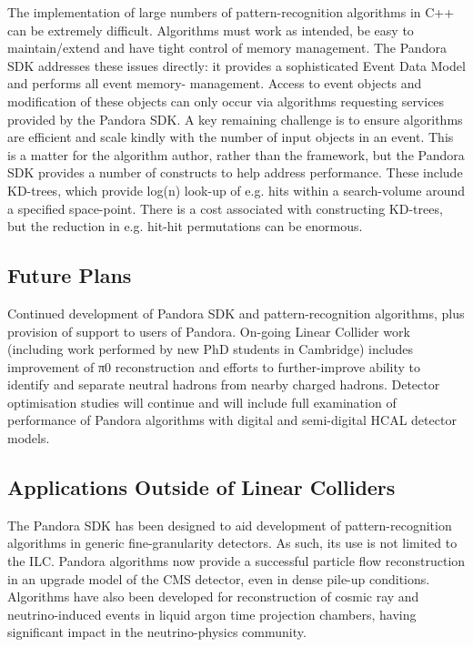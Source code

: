 The implementation of large numbers of pattern-recognition algorithms in C++ can
be extremely difficult. Algorithms must work as intended, be easy to
maintain/extend and have tight control of memory management. The Pandora SDK
addresses these issues directly: it provides a sophisticated Event Data Model
and performs all event memory- management. Access to event objects and
modification of these objects can only occur via algorithms requesting services
provided by the Pandora SDK. A key remaining challenge is to ensure algorithms
are efficient and scale kindly with the number of input objects in an event.
This is a matter for the algorithm author, rather than the framework, but the
Pandora SDK provides a number of constructs to help address performance. These
include KD-trees, which provide log(n) look-up of e.g. hits within a
search-volume around a specified space-point. There is a cost associated with
constructing KD-trees, but the reduction in e.g. hit-hit permutations can be
enormous.

\subsection{Future Plans}

Continued development of Pandora SDK and pattern-recognition algorithms, plus
provision of support to users of Pandora. On-going Linear Collider work
(including work performed by new PhD students in Cambridge) includes improvement
of π0 reconstruction and efforts to further-improve ability to identify and
separate neutral hadrons from nearby charged hadrons. Detector optimisation
studies will continue and will include full examination of performance of
Pandora algorithms with digital and semi-digital HCAL detector models.

\subsection{Applications Outside of Linear Colliders}

The Pandora SDK has been designed to aid development of pattern-recognition
algorithms in generic fine-granularity detectors. As such, its use is not
limited to the ILC. Pandora algorithms now provide a successful particle flow
reconstruction in an upgrade model of the CMS detector, even in dense pile-up
conditions. Algorithms have also been developed for reconstruction of cosmic ray
and neutrino-induced events in liquid argon time projection chambers, having
significant impact in the neutrino-physics community.

